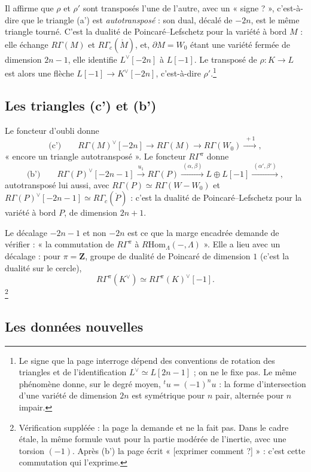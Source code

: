 \documentclass[11pt,a4paper]{article}
\begin{document}
Il affirme que $\rho$ et $\rho'$ sont transposés l'une de l'autre, avec un
« signe ? », c'est-à-dire que le triangle (a') est
\emph{autotransposé} : son dual, décalé de $-2n$, est le même triangle tourné.
C'est la dualité de Poincaré--Lefschetz pour la variété à bord $M$ : elle
échange $R\Gamma(M)$ et $R\Gamma_{c}(\mathring{M})$, et, $\partial M = W_0$
étant une variété fermée de dimension $2n-1$, elle identifie $L^{\vee}[-2n]$ à
$L[-1]$. Le transposé de $\rho : K \to L$ est alors une flèche
$L[-1] \to K^{\vee}[-2n]$, c'est-à-dire $\rho'$.\footnote{Le signe que la page
interroge dépend des conventions de rotation des triangles et de
l'identification $L^{\vee} \simeq L[2n-1]$ ; on ne le fixe pas. Le même
phénomène donne, sur le degré moyen, ${}^{t}u = (-1)^{n} u$ : la forme
d'intersection d'une variété de dimension $2n$ est symétrique pour $n$ pair,
alternée pour $n$ impair.}

\subsection*{Les triangles (c') et (b')}

Le foncteur d'oubli donne
\[
  \text{(c')} \qquad R\Gamma(M)^{\vee}[-2n] \longrightarrow R\Gamma(M)
  \longrightarrow R\Gamma(W_0) \xrightarrow{\ +1\ },
\]
« encore un triangle autotransposé ». Le foncteur $R\Gamma^{\pi}$ donne
\[
  \text{(b')} \qquad R\Gamma(P)^{\vee}[-2n-1] \xrightarrow{\ u_1\ }
  R\Gamma(P) \xrightarrow{\ (\alpha, \beta)\ } L \oplus L[-1]
  \xrightarrow{\ (\alpha', \beta')\ } ,
\]
autotransposé lui aussi, avec $R\Gamma(P) \simeq R\Gamma(W - W_0)$ et
$R\Gamma(P)^{\vee}[-2n-1] \simeq R\Gamma_{c}(\mathring{P})$ : c'est la
dualité de Poincaré--Lefschetz pour la variété à bord $P$, de dimension
$2n+1$.

Le décalage $-2n-1$ et non $-2n$ est ce que la marge encadrée demande de
vérifier : « la commutation de $R\Gamma^{\pi}$ à $R\mathrm{Hom}_{\Lambda}(-,
\Lambda)$ ». Elle a lieu avec un décalage : pour $\pi = \mathbf{Z}$, groupe de
dualité de Poincaré de dimension $1$ (c'est la dualité sur le cercle),
\[
  R\Gamma^{\pi}(K^{\vee}) \simeq R\Gamma^{\pi}(K)^{\vee}[-1] .
\]
\footnote{Vérification suppléée : la page la demande et ne la fait pas. Dans le
cadre étale, la même formule vaut pour la partie modérée de l'inertie, avec
une torsion $(-1)$. Après (b') la page écrit « [exprimer comment ?] » : c'est
cette commutation qui l'exprime.}

\subsection*{Les données nouvelles}
\end{document}
